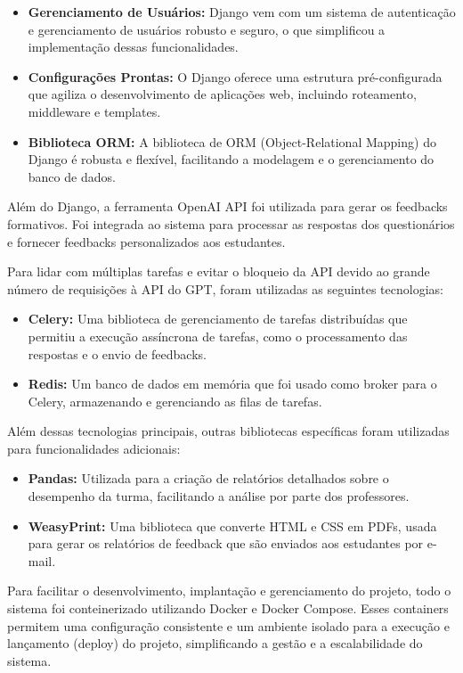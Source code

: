 \begin{itemize}
    \item \textbf{Gerenciamento de Usuários:} Django vem com um sistema de autenticação e gerenciamento de usuários robusto e seguro, o que simplificou a implementação dessas funcionalidades.
    \item \textbf{Configurações Prontas:} O Django oferece uma estrutura pré-configurada que agiliza o desenvolvimento de aplicações web, incluindo roteamento, middleware e templates.
    \item \textbf{Biblioteca ORM:} A biblioteca de ORM (Object-Relational Mapping) do Django é robusta e flexível, facilitando a modelagem e o gerenciamento do banco de dados.
\end{itemize}

Além do Django, a ferramenta OpenAI API foi utilizada para gerar os feedbacks formativos. Foi integrada ao sistema para processar as respostas dos questionários e fornecer feedbacks personalizados aos estudantes.

Para lidar com múltiplas tarefas e evitar o bloqueio da API devido ao grande número de requisições à API do GPT, foram utilizadas as seguintes tecnologias:

\begin{itemize}
    \item \textbf{Celery:} Uma biblioteca de gerenciamento de tarefas distribuídas que permitiu a execução assíncrona de tarefas, como o processamento das respostas e o envio de feedbacks.
    \item \textbf{Redis:} Um banco de dados em memória que foi usado como broker para o Celery, armazenando e gerenciando as filas de tarefas.
\end{itemize}

Além dessas tecnologias principais, outras bibliotecas específicas foram utilizadas para funcionalidades adicionais:

\begin{itemize}
    \item \textbf{Pandas:} Utilizada para a criação de relatórios detalhados sobre o desempenho da turma, facilitando a análise por parte dos professores.
    \item \textbf{WeasyPrint:} Uma biblioteca que converte HTML e CSS em PDFs, usada para gerar os relatórios de feedback que são enviados aos estudantes por e-mail.
\end{itemize}

Para facilitar o desenvolvimento, implantação e gerenciamento do projeto, todo o sistema foi conteinerizado utilizando Docker e Docker Compose. Esses containers permitem uma configuração consistente e um ambiente isolado para a execução e lançamento (deploy) do projeto, simplificando a gestão e a escalabilidade do sistema. 

